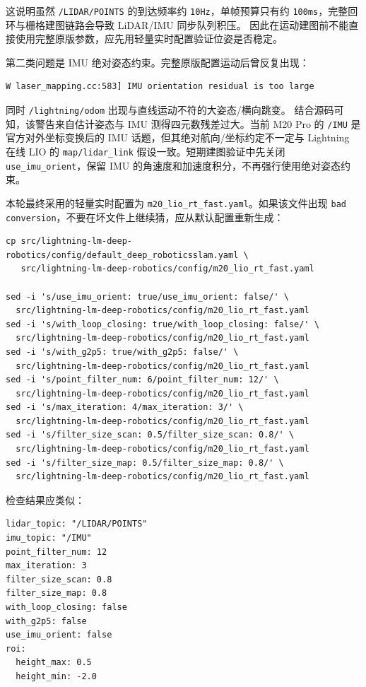 \documentclass[UTF8,11pt,a4paper]{ctexart}
\begin{document}
这说明虽然 \texttt{/LIDAR/POINTS} 的到达频率约 \texttt{10Hz}，单帧预算只有约
\texttt{100ms}，完整回环与栅格建图链路会导致 LiDAR/IMU 同步队列积压。
因此在运动建图前不能直接使用完整原版参数，应先用轻量实时配置验证位姿是否稳定。

第二类问题是 IMU 绝对姿态约束。完整原版配置运动后曾反复出现：

\begin{verbatim}
W laser_mapping.cc:583] IMU orientation residual is too large
\end{verbatim}

同时 \texttt{/lightning/odom} 出现与直线运动不符的大姿态/横向跳变。
结合源码可知，该警告来自估计姿态与 IMU 测得四元数残差过大。当前 M20 Pro 的
\texttt{/IMU} 是官方对外坐标变换后的 IMU 话题，但其绝对航向/坐标约定不一定与
Lightning 在线 LIO 的 \texttt{map/lidar\_link} 假设一致。短期建图验证中先关闭
\texttt{use\_imu\_orient}，保留 IMU 的角速度和加速度积分，不再强行使用绝对姿态约束。

本轮最终采用的轻量实时配置为 \texttt{m20\_lio\_rt\_fast.yaml}。如果该文件出现
\texttt{bad conversion}，不要在坏文件上继续猜，应从默认配置重新生成：

\begin{verbatim}
cp src/lightning-lm-deep-robotics/config/default_deep_roboticsslam.yaml \
   src/lightning-lm-deep-robotics/config/m20_lio_rt_fast.yaml

sed -i 's/use_imu_orient: true/use_imu_orient: false/' \
  src/lightning-lm-deep-robotics/config/m20_lio_rt_fast.yaml
sed -i 's/with_loop_closing: true/with_loop_closing: false/' \
  src/lightning-lm-deep-robotics/config/m20_lio_rt_fast.yaml
sed -i 's/with_g2p5: true/with_g2p5: false/' \
  src/lightning-lm-deep-robotics/config/m20_lio_rt_fast.yaml
sed -i 's/point_filter_num: 6/point_filter_num: 12/' \
  src/lightning-lm-deep-robotics/config/m20_lio_rt_fast.yaml
sed -i 's/max_iteration: 4/max_iteration: 3/' \
  src/lightning-lm-deep-robotics/config/m20_lio_rt_fast.yaml
sed -i 's/filter_size_scan: 0.5/filter_size_scan: 0.8/' \
  src/lightning-lm-deep-robotics/config/m20_lio_rt_fast.yaml
sed -i 's/filter_size_map: 0.5/filter_size_map: 0.8/' \
  src/lightning-lm-deep-robotics/config/m20_lio_rt_fast.yaml
\end{verbatim}

检查结果应类似：

\begin{verbatim}
lidar_topic: "/LIDAR/POINTS"
imu_topic: "/IMU"
point_filter_num: 12
max_iteration: 3
filter_size_scan: 0.8
filter_size_map: 0.8
with_loop_closing: false
with_g2p5: false
use_imu_orient: false
roi:
  height_max: 0.5
  height_min: -2.0
\end{verbatim}
\end{document}
